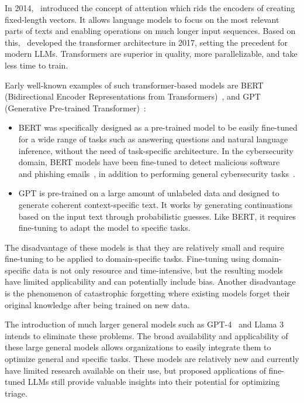 In 2014,\ \citet{bahdanau2014neural} introduced the concept of attention which rids the encoders of creating
fixed-length vectors.
It allows language models to focus on the most relevant parts of texts and enabling operations on much longer input
sequences.
Based on this,\ \citet{vaswani2017attention} developed the transformer architecture in 2017, setting the precedent for
modern LLMs.
Transformers are superior in quality, more parallelizable, and take less time to train.

Early well-known examples of such transformer-based models are BERT
(Bidirectional Encoder Representations from Transformers)\ \citep{devlin2018bert}, and
GPT (Generative Pre-trained Transformer)\ \citep{radford2018improving}:
\begin{itemize}
    \item BERT was specifically designed as a pre-trained model to be easily fine-tuned for a wide range of tasks such
    as answering questions and natural language inference, without the need of task-specific architecture.
    In the cybersecurity domain, BERT models have been fine-tuned to detect malicious
    software\ \citep{rahali2021malbert} and phishing emails\ \citep{lee2020catbert}, in addition to performing general
    cybersecurity tasks\ \citep{bayer2024cysecbert}.

    \item GPT is pre-trained on a large amount of unlabeled data and designed to generate coherent context-specific
    text.
    It works by generating continuations based on the input text through probabilistic guesses.
    Like BERT, it requires fine-tuning to adapt the model to specific tasks.
\end{itemize}

The disadvantage of these models is that they are relatively small and require fine-tuning to be applied to
domain-specific tasks.
Fine-tuning using domain-specific data is not only resource and time-intensive, but the resulting models have limited
applicability and can potentially include bias.
Another disadvantage is the phenomenon of catastrophic forgetting where existing models forget their original knowledge
after being trained on new data.

The introduction of much larger general models such as GPT-4\ \citep{achiam2023gpt} and Llama 3\ \citep{meta:llama3}
intends to eliminate these problems.
The broad availability and applicability of these large general models allows organizations to easily integrate them to
optimize general and specific tasks.
These models are relatively new and currently have limited research available on their use, but proposed
applications of fine-tuned LLMs still provide valuable insights into their potential for optimizing triage.

